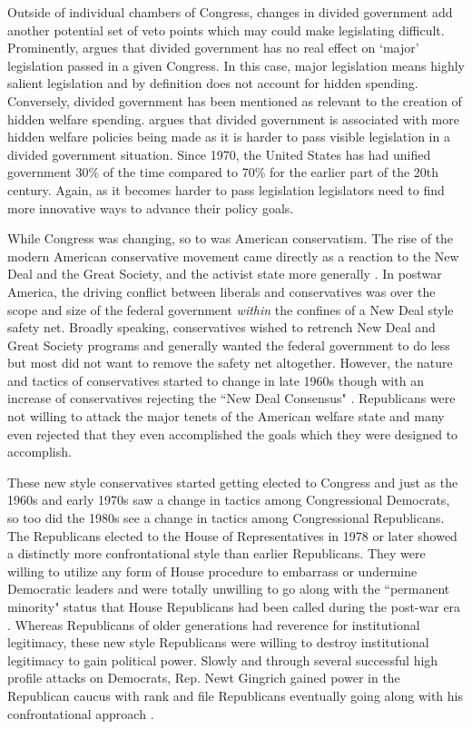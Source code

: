 \documentclass[12pt]{article}
\begin{document}
Outside of individual chambers of Congress, changes in divided government add another potential set of veto points which may could make legislating difficult. Prominently, \cite{mayhew1990} argues that divided government has no real effect on `major' legislation passed in a given Congress. In this case, major legislation means highly salient legislation and by definition does not account for hidden spending. Conversely, divided government has been mentioned as relevant to the creation of hidden welfare spending. \citet[Ch. 4]{howard2008} argues that divided government is associated with more hidden welfare policies being made as it is harder to pass visible legislation in a divided government situation. Since 1970, the United States has had unified government 30\% of the time compared to 70\% for the earlier part of the 20th century. Again, as it becomes harder to pass legislation legislators need to find more innovative ways to advance their policy goals.

While Congress was changing, so to was American conservatism. The rise of the modern American conservative movement came directly as a reaction to the New Deal and the Great Society, and the activist state more generally \citep{critchlow2007, zelizer2010}. In postwar America, the driving conflict between liberals and conservatives was over the scope and size of the federal government \emph{within} the confines of a New Deal style safety net. Broadly speaking, conservatives wished to retrench New Deal and Great Society programs and generally wanted the federal government to do less but most did not want to remove the safety net altogether. However, the nature and tactics of conservatives started to change in late 1960s though with an increase of conservatives rejecting the ``New Deal Consensus" \citep{teles2007, skocpol2007}. Republicans were not willing to attack the major tenets of the American welfare state and many even rejected that they even accomplished the goals which they were designed to accomplish.

These new style conservatives started getting elected to Congress and just as the 1960s and early 1970s saw a change in tactics among Congressional Democrats, so too did the 1980s see a change in tactics among Congressional Republicans. The Republicans elected to the House of Representatives in 1978 or later showed a distinctly more confrontational style than earlier Republicans. They were willing to utilize any form of House procedure to embarrass or undermine Democratic leaders and were totally unwilling to go along with the ``permanent minority" status that House Republicans had been called during the post-war era \citep{theriault2013}. Whereas Republicans of older generations had reverence for institutional legitimacy, these new style Republicans were willing to destroy institutional legitimacy to gain political power. Slowly and through several successful high profile attacks on Democrats, Rep. Newt Gingrich gained power in the Republican caucus with rank and file Republicans eventually going along with his confrontational approach \citep{harris2006}. 
\end{document}

